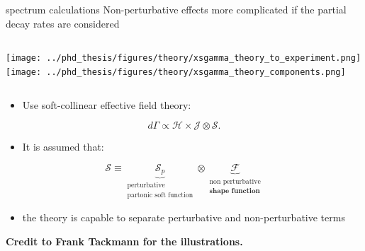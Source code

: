 \documentclass[xcolor=dvipsnames]{beamer}
\begin{document}
\begin{frame}{\safeBtoXsdgamma spectrum calculations}
   \small
      Non-perturbative effects more complicated if the partial decay rates are considered
   
      \begin{columns}
         \texttt{[image: ../phd\_thesis/figures/theory/xsgamma\_theory\_to\_experiment.png]}
         \texttt{[image: ../phd\_thesis/figures/theory/xsgamma\_theory\_components.png]}
      \end{columns}
   
      \begin{itemize}
         \item Use soft-collinear effective field theory:
      \end{itemize}
      \begin{equation}\nonumber
         d\Gamma \propto \mathcal{H} \times \mathcal{J} \otimes \mathcal{S}.
     \end{equation}

     \vspace{-10pt}
     \begin{itemize}
      \item It is assumed that:
     \end{itemize}
     \begin{equation}\nonumber
      \mathcal{S} \equiv \underbrace{\mathcal{S}_p}_{\substack{\text{perturbative}\\\text{partonic soft function}}} \otimes \underbrace{\mathcal{F}}_{\substack{\text{non perturbative}\\\textbf{shape function}}}
     \end{equation}
     \begin{itemize}
      \item[\ra] the theory is capable to separate perturbative and non-perturbative terms 
     \end{itemize}

   \vspace{-5pt}
   
   \begin{flushright}
      \tiny \textbf{Credit to Frank Tackmann for the illustrations.}
   \end{flushright}
   
   \end{frame}
\end{document}
